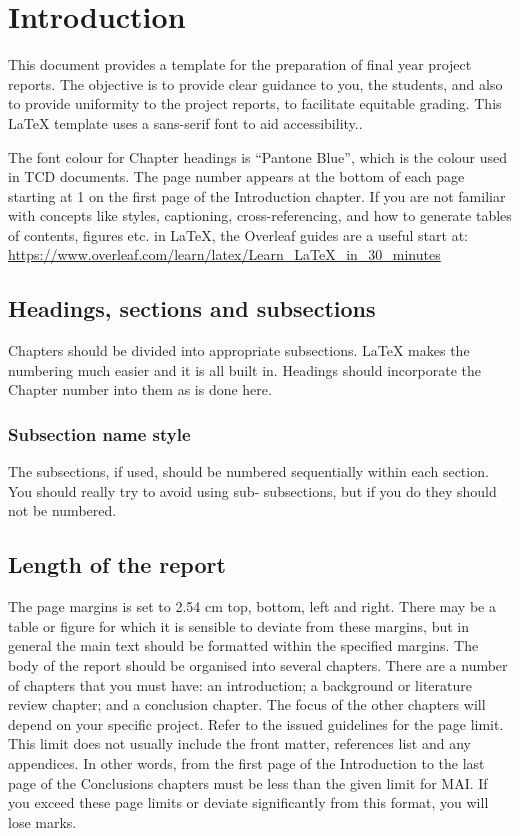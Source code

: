 \chapter{Introduction}
This document provides a template for the preparation of final year project reports. The objective is to provide clear guidance to you, the students, and also to provide uniformity to the project reports, to facilitate equitable grading.
This LaTeX template uses a sans-serif font to aid accessibility..

The font colour for Chapter headings is “Pantone Blue”, which is the colour used in TCD documents. The page number appears at the bottom of each page starting at 1 on the first page of the Introduction chapter.
If you are not familiar with concepts like styles, captioning, cross-referencing, and how to generate tables of contents, figures etc. in LaTeX, the Overleaf guides are a useful start at: \url{https://www.overleaf.com/learn/latex/Learn_LaTeX_in_30_minutes}

\section{Headings, sections and subsections}
Chapters should be divided into appropriate subsections. LaTeX makes the numbering much easier and it is all built in. Headings should incorporate the Chapter number into them as is done here.

\subsection{Subsection name style}
The subsections, if used, should be numbered sequentially within each section.  You should really try to avoid using sub‐ subsections, but if you do they should not be numbered.

\section{Length of the report}
The page margins is set to 2.54 cm top, bottom, left and right. There may be a table or figure for which it is sensible to deviate from these margins, but in general the main text should be formatted within the specified margins.
The body of the report should be organised into several chapters. There are a number of chapters that you must have: an introduction; a background or literature review chapter; and a conclusion chapter. The focus of the other chapters will depend on your specific project. Refer to the issued guidelines for the page limit. This limit does not usually include the front matter, references list and any appendices. In other words, from the first page of the Introduction to the last page of the Conclusions chapters must be less than the given limit for MAI.
If you exceed these page limits or deviate significantly from this format, you will lose marks.
